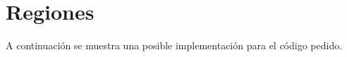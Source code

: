 \section{Regiones}

A continuación se muestra una posible implementación para el código pedido.
  

